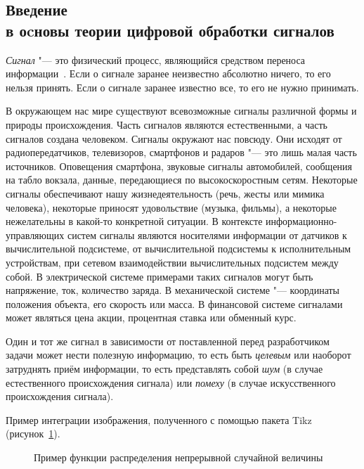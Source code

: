 \begin{center}
	\section*{Введение \\ в оcновы теории цифровой обработки сигналов}
\end{center}

\emph{Сигнал} "--- это физический процесс, являющийся средством переноса информации~\cite{Suzev}. 
Если о сигнале заранее неизвестно абсолютно ничего, то его нельзя  принять.
Если о сигнале заранее известно все, то его не нужно принимать.

В окружающем нас мире существуют всевозможные сигналы различной формы и природы происхождения. Часть сигналов являются естественными, а часть сигналов создана человеком. Сигналы окружают нас повсюду. Они исходят от радиопередатчиков, телевизоров, смартфонов и радаров "--- это лишь малая часть источников. Оповещения смартфона, звуковые сигналы автомобилей, сообщения на табло вокзала, данные, передающиеся по высокоскоростным сетям. Некоторые сигналы обеспечивают нашу жизнедеятельность (речь, жесты или мимика человека), некоторые приносят удовольствие (музыка, фильмы), а некоторые нежелательны в какой-то конкретной ситуации. В контексте информационно-управляющих систем сигналы являются носителями информации от датчиков к вычислительной подсистеме, от вычислительной подсистемы к исполнительным устройствам, при сетевом взаимодействии вычислительных подсистем между собой. В электрической системе примерами таких сигналов могут быть напряжение, ток, количество заряда. В механической системе "--- координаты положения объекта, его скорость или масса. В финансовой системе сигналами может являться цена акции, процентная ставка или обменный курс. 

Один и тот же сигнал в зависимости от поставленной перед разработчиком задачи может нести полезную информацию, то есть быть \emph{целевым} или наоборот затруднять приём информации, то есть представлять собой \emph{шум} (в случае естественного происхождения сигнала) или \emph{помеху} (в случае искусственного происхождения сигнала).


Пример интеграции изображения, полученного с помощью пакета Tikz (рисунок~\ref{labN_fig:probability}).

\begin{figure}[pt!]
	\centering
	\scalebox{.85}{}
	\caption{Пример функции распределения непрерывной случайной величины}
	\label{labN_fig:probability}
\end{figure}


